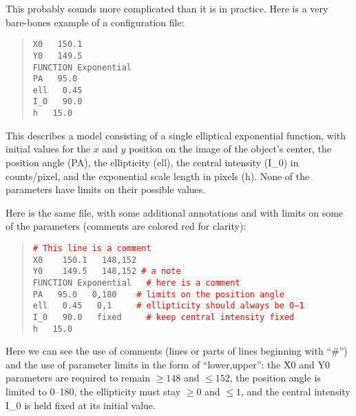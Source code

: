 \documentclass[10pt,a4paper,article]{memoir}
\newcommand{\red}{\textcolor{red}}
\begin{document}
This probably sounds more complicated than it is in practice.
Here is a very bare-bones example of a configuration file:

\begin{quote}
  \texttt{X0  ~  150.1}\\
  \texttt{Y0  ~  149.5}\\
  \texttt{FUNCTION   Exponential}\\
  \texttt{PA  ~  95.0}\\
  \texttt{ell  ~  0.45}\\
  \texttt{I\_0 ~  90.0}\\
  \texttt{h   ~  15.0}\\
\end{quote}

This describes a model consisting of a single elliptical exponential
function, with initial values for the $x$ and $y$ position on the image
of the object's center, the position angle (PA), the ellipticity (ell),
the central intensity (I\_0) in counts/pixel, and the exponential scale
length in pixels (h). None of the parameters have limits on their
possible values.

Here is the same file, with some additional annotations and with limits on
some of the parameters (comments are colored red for clarity):

\begin{quote}
  \texttt{\red{\# This line is a comment}}\\
  
  \texttt{X0 ~~   150.1 ~  148,152}\\
  \texttt{Y0 ~~   149.5 ~  148,152         \red{\# a note}}\\
  \texttt{FUNCTION   Exponential  ~ \red{\# here is a comment}}\\
  \texttt{PA  ~  95.0  ~ 0,180   ~~   \red{\# limits on the position angle}}\\
  \texttt{ell  ~  0.45 ~ 0,1     ~~~ \red{\# ellipticity should always be 0--1}}\\
  \texttt{I\_0 ~  90.0 ~  fixed ~~~ \red{\# keep central intensity fixed}}\\
  \texttt{h    ~ 15.0}\\
\end{quote}

Here we can see the use of comments (lines or parts of lines beginning with
``\#'') and the use of parameter limits in the form of ``lower,upper'': the X0
and Y0 parameters are required to remain $\geq 148$ and $\leq 152$, the position
angle is limited to 0--180, the ellipticity must stay $\geq 0$ and $\leq 1$, and
the central intensity I\_0 is held fixed at its initial value.
\end{document}
